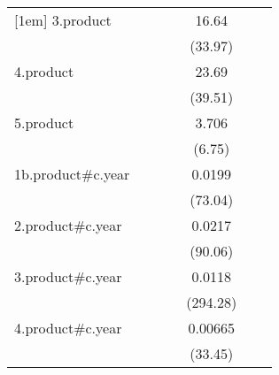 {\begin{tabular}{l*{6}{c}}
[1em]
3.product           &                     &                     &                     &       16.64\sym{***}&                     &                     \\
                    &                     &                     &                     &     (33.97)         &                     &                     \\
[1em]
4.product           &                     &                     &                     &       23.69\sym{***}&                     &                     \\
                    &                     &                     &                     &     (39.51)         &                     &                     \\
[1em]
5.product           &                     &                     &                     &       3.706\sym{***}&                     &                     \\
                    &                     &                     &                     &      (6.75)         &                     &                     \\
[1em]
1b.product#c.year   &                     &                     &                     &      0.0199\sym{***}&                     &                     \\
                    &                     &                     &                     &     (73.04)         &                     &                     \\
[1em]
2.product#c.year    &                     &                     &                     &      0.0217\sym{***}&                     &                     \\
                    &                     &                     &                     &     (90.06)         &                     &                     \\
[1em]
3.product#c.year    &                     &                     &                     &      0.0118\sym{***}&                     &                     \\
                    &                     &                     &                     &    (294.28)         &                     &                     \\
[1em]
4.product#c.year    &                     &                     &                     &     0.00665\sym{***}&                     &                     \\
                    &                     &                     &                     &     (33.45)         &                     &                     \\

\end{tabular}}
